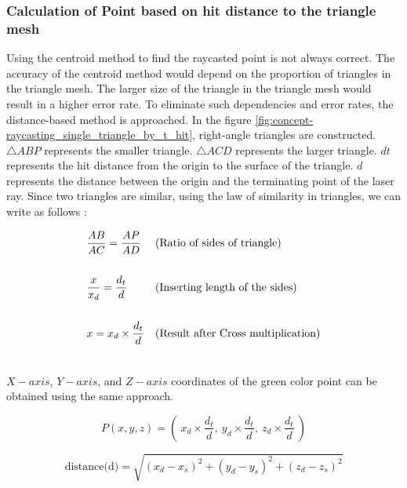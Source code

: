 \subsubsection{Calculation of Point based on hit distance to the triangle mesh}
Using the centroid method to find the raycasted point is not always correct. The accuracy of the centroid method would depend on the proportion of triangles in the triangle mesh. The larger size of the triangle in the triangle mesh would result in a higher error rate. To eliminate such dependencies and error rates, the distance-based method is approached.  
In the figure \ref{fig:concept-raycasting_single_triangle_by_t_hit}, right-angle triangles are constructed. $\triangle ABP$ represents the smaller triangle. $\triangle ACD$ represents the larger triangle. \(dt\) represents the hit distance from the origin to the surface of the triangle. \(d\) represents the distance between the origin and the terminating point of the laser ray. Since two triangles are similar, using the law of similarity in triangles, we can write as follows : 

\begin{gather*}
\begin{aligned}
&\frac{AB}{AC} = \frac{AP}{AD} && \text{(Ratio of sides of triangle)}\hfill \\ \\
&\frac{x}{x_d} = \frac{d_t}{d} && \text{(Inserting length of the sides)}\hfill \\  \\
&x = x_d \times \frac{d_t}{d} && \text{(Result after Cross multiplication)}\hfill  \\  \\
\end{aligned}
\end{gather*}

\(X-axis\), \(Y-axis\), and \(Z-axis\) coordinates of the green color point can be obtained using the same approach.

\begin{equation}\label{eq:find_xyz}
    P(x, y, z) = \left( \: x_d \times \frac{d_t}{d}, \: y_d \times \frac{d_t}{d}, \: z_d \times \frac{d_t}{d} \: \right)
\end{equation}

\begin{equation}\label{eq:distance}
\text{distance(d)} = \sqrt{{(x_d - x_s)}^2 + {(y_d - y_s)}^2 + {(z_d - z_s)}^2}
\end{equation}


